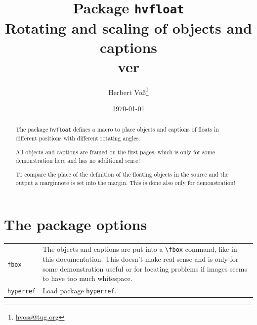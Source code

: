 \documentclass[twoside,paper=a4]{scrartcl}
\makeatletter
\def\Lcs#1{\texttt{\textbackslash#1}\index{#1@\texttt{\textbackslash#1}}}
\def\Lpack#1{\texttt{#1}\index{#1@\texttt{#1} (package)}}
\def\Loption#1{\texttt{#1}\index{#1@\texttt{#1} (package option)}}
\makeatother
\begin{document}
\title{Package \texttt{hvfloat}\\Rotating and scaling of objects and captions\\ver \hvFileVersion}
\author{Herbert Voß\thanks{\protect\url{hvoss@tug.org}}}
\date{\today}
\maketitle



\begin{abstract}
The package \texttt{hvfloat} defines a macro to place objects and captions of floats in different 
positions with different rotating angles.

All objects and captions are framed on the first pages, which is only for some demonstration here and 
has no additional sense!

To compare the place of the definition of the floating objects in the source and the output a
marginnote  is set into the margin. This is done also only for demonstration!
\end{abstract}
\vfill


\vspace*{\fill}

\clearpage


\tableofcontents

\clearpage

\listoftables
\listoffigures


\clearpage
\section{The package options}

\noindent\begin{tabularx}{\textwidth}{lX}
\Loption{fbox} & The objects and captions are put into a \Lcs{fbox} command, like in 
this documentation. This doesn't make real sense and is only for some demonstration useful or for locating
problems if images seems to have too much whitespace.\\
\Loption{hyperref} & Load package \Lpack{hyperref}. %
\end{tabularx}

\bigskip
\end{document}
